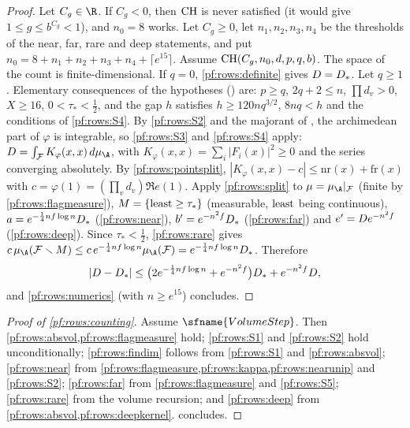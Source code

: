 \begin{proof}
Let $C_g\in\R$. If $C_g<0$, then $\mathrm{CH}$ is never satisfied (it would give $1\le g\le b^{C_g}<1$), and $n_0=8$
works. Let $C_g\ge0$, let $n_1,n_2,n_3,n_4$ be the thresholds of the near, far, rare and deep statements, and put
$n_0=8+n_1+n_2+n_3+n_4+\lceil e^{15}\rceil$. Assume $\mathrm{CH}(C_g,n_0,d,p,q,b)$. The space of the count is
finite-dimensional. If $q=0$, \cref{pf:rows:definite} gives $D=D_*$. Let $q\ge1$. Elementary consequences of the
hypotheses () are: $p\ge q$, $2q+2\le n$, $\prod d_v>0$, $X\ge16$,
$0<\tau_*<\frac12$, and the gap $h$ satisfies $h\ge120nq^{3/2}$, $8nq<h$ and the conditions of \ref{pf:rows:S4}. By
\ref{pf:rows:S2} and the majorant of , the archimedean part of $\varphi$ is
integrable, so \ref{pf:rows:S3} and \ref{pf:rows:S4} apply: $\rowsDc=\int_{\mathcal F}K_\varphi(x,x)\,d\mu_{\A}$, with
$K_\varphi(x,x)=\sum_i|F_i(x)|^2\ge0$ and the series converging absolutely. By \cref{pf:rows:pointsplit},
$|K_\varphi(x,x)-c|\le\mathrm{nr}(x)+\mathrm{fr}(x)$ with $c=\varphi(1)=(\prod_vd_v)\Re e(1)$. Apply \cref{pf:rows:split} to
$\mu=\mu_{\A}|_{\mathcal F}$ (finite by \cref{pf:rows:flagmeasure}), $M=\{\operatorname{least}\ge\tau_*\}$ (measurable, $\operatorname{least}$ being
continuous), $a=e^{-\frac14nf\log n}D_*$ (\cref{pf:rows:near}), $b'=e^{-n^2f}D_*$ (\cref{pf:rows:far}) and
$e'=D e^{-n^2f}$ (\cref{pf:rows:deep}). Since $\tau_*<\frac12$, \cref{pf:rows:rare} gives
$c\,\mu_{\A}(\mathcal F\smallsetminus M)\le c\,e^{-\frac14nf\log n}\mu_{\A}(\mathcal F)=e^{-\frac14nf\log n}\rowsDst$. Therefore
\[
|D-D_*|\le\bigl(2e^{-\frac14nf\log n}+e^{-n^2f}\bigr)D_*+e^{-n^2f}D,
\]
and \cref{pf:rows:numerics} (with $n\ge e^{15}$) concludes.
\end{proof}

\begin{proof}[Proof of \cref{pf:rows:counting}]
Assume $\sfname{VolumeStep}$. Then \cref{pf:rows:absvol,pf:rows:flagmeasure} hold; \ref{pf:rows:S1} and \ref{pf:rows:S2}
hold unconditionally; \cref{pf:rows:findim} follows from \ref{pf:rows:S1} and \cref{pf:rows:absvol};
\cref{pf:rows:near} from \cref{pf:rows:flagmeasure,pf:rows:kappa,pf:rows:nearunip} and \ref{pf:rows:S2};
\cref{pf:rows:far} from \cref{pf:rows:flagmeasure} and \ref{pf:rows:S5}; \cref{pf:rows:rare} from the volume recursion;
and \cref{pf:rows:deep} from \cref{pf:rows:absvol,pf:rows:deepkernel}.  concludes.
\end{proof}

